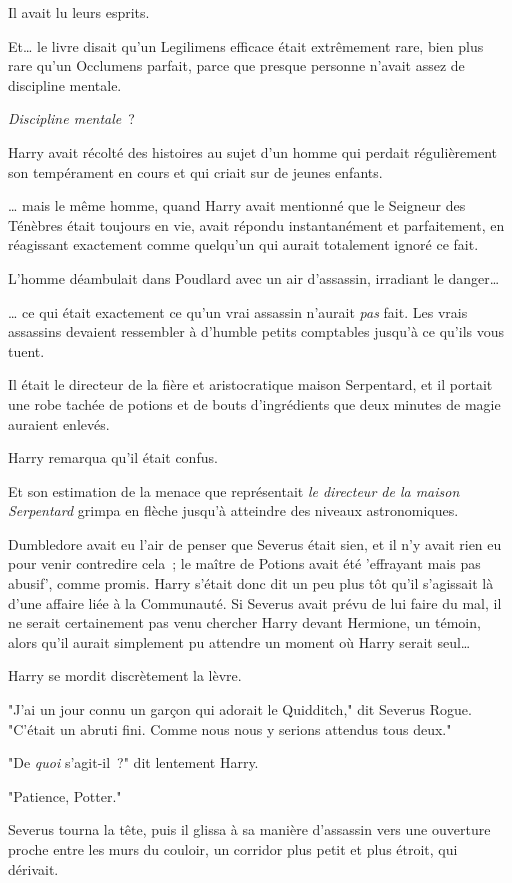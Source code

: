 Il avait lu leurs esprits.

Et… le livre disait qu'un Legilimens efficace était extrêmement rare, bien plus rare qu'un Occlumens parfait, parce que presque personne n'avait assez de discipline mentale.

\emph{Discipline mentale}~?

Harry avait récolté des histoires au sujet d'un homme qui perdait régulièrement son tempérament en cours et qui criait sur de jeunes enfants.

… mais le même homme, quand Harry avait mentionné que le Seigneur des Ténèbres était toujours en vie, avait répondu instantanément et parfaitement, en réagissant exactement comme quelqu'un qui aurait totalement ignoré ce fait.

L'homme déambulait dans Poudlard avec un air d'assassin, irradiant le danger…

… ce qui était exactement ce qu'un vrai assassin n'aurait \emph{pas} fait. Les vrais assassins devaient ressembler à d'humble petits comptables jusqu'à ce qu'ils vous tuent.

Il était le directeur de la fière et aristocratique maison Serpentard, et il portait une robe tachée de potions et de bouts d'ingrédients que deux minutes de magie auraient enlevés.

Harry remarqua qu'il était confus.

Et son estimation de la menace que représentait \emph{le directeur de la maison Serpentard} grimpa en flèche jusqu'à atteindre des niveaux astronomiques.

Dumbledore avait eu l'air de penser que Severus était sien, et il n'y avait rien eu pour venir contredire cela~; le maître de Potions avait été 'effrayant mais pas abusif', comme promis. Harry s'était donc dit un peu plus tôt qu'il s'agissait là d'une affaire liée à la Communauté. Si Severus avait prévu de lui faire du mal, il ne serait certainement pas venu chercher Harry devant Hermione, un témoin, alors qu'il aurait simplement pu attendre un moment où Harry serait seul…

Harry se mordit discrètement la lèvre.

"J'ai un jour connu un garçon qui adorait le Quidditch," dit Severus Rogue. "C'était un abruti fini. Comme nous nous y serions attendus tous deux."

"De \emph{quoi} s'agit-il~?" dit lentement Harry.

"Patience, Potter."

Severus tourna la tête, puis il glissa à sa manière d'assassin vers une ouverture proche entre les murs du couloir, un corridor plus petit et plus étroit, qui dérivait.

